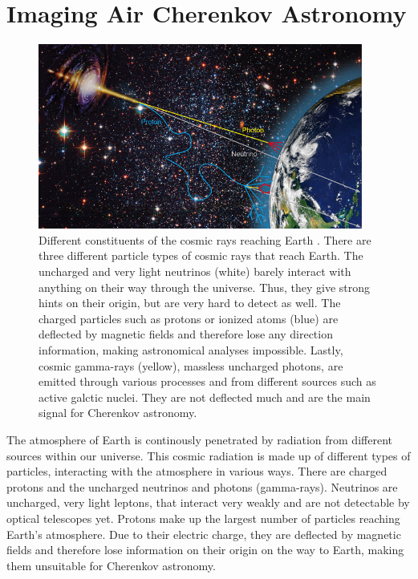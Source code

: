 \chapter{Imaging Air Cherenkov Astronomy}
\label{ch:iact}
%
\begin{figure}[H]
  \centering
  \includegraphics[width=0.95\textwidth]{Plots/cosmic_rays.jpg}
  \caption{Different constituents of the cosmic rays reaching Earth \cite{cosmic-rays}. There are three different particle types of cosmic rays that reach Earth. The uncharged and very light neutrinos (white) barely interact with anything on their way through the universe. Thus, they give strong hints on their origin, but are very hard to detect as well. The charged particles such as protons or ionized atoms (blue) are deflected by magnetic fields and therefore lose any direction information, making astronomical analyses impossible. Lastly, cosmic gamma-rays (yellow), massless uncharged photons, are emitted through various processes and from different sources such as active galctic nuclei. They are not deflected much and are the main signal for Cherenkov astronomy.}
  \label{fig:rays}
\end{figure}
%
The atmosphere of Earth is continously penetrated by radiation from different
sources within our universe. This cosmic radiation is made up of different types
of particles, interacting with the atmosphere in various ways. There are
charged protons and the uncharged neutrinos and photons (gamma-rays). Neutrinos
are uncharged, very light leptons, that interact very weakly and are not
detectable by optical telescopes yet. Protons make up the largest number of
particles reaching Earth's atmosphere. Due to their electric charge, they are
deflected by magnetic fields and therefore lose information on their origin on
the way to Earth, making them unsuitable for Cherenkov astronomy.
%
